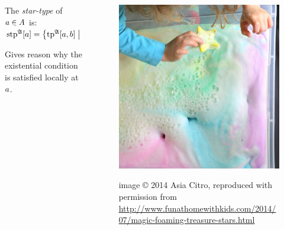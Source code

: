 \documentclass{beamer}
\begin{document}
\begin{frame}
\begin{columns}[T]
\begin{column}{0.55\textwidth}
The \emph{star-type} of $a\in A$ is:
$\operatorname{stp}^{\mathfrak{A}}[a] = \left\{\operatorname{tp}^{\mathfrak{A}}[a,b]\mathrel{}\middle|\mathrel{}b\in A\setminus\left\{a\right\}\right\}$


Gives reason why the existential condition is satisfied locally at $a$.
\end{column}
\begin{column}{0.55\textwidth}
\begin{figure}
\includegraphics[scale=0.1]{1-IMG_4360.JPG}

{\tiny image © 2014 Asia Citro, reproduced with permission from \\
\url{http://www.funathomewithkids.com/2014/07/magic-foaming-treasure-stars.html}}
\end{figure}
\end{column}
\end{columns}

\end{frame}
\end{document}
